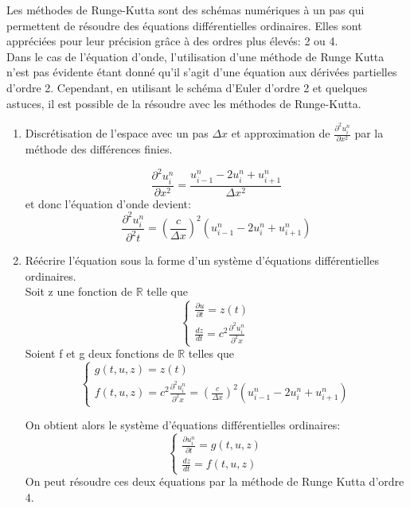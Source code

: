 Les méthodes de Runge-Kutta sont des schémas numériques à un pas qui permettent de résoudre des équations différentielles ordinaires.
Elles sont appréciées pour leur précision grâce à des ordres plus élevés: 2 ou 4.\\

Dans le cas de l'équation d'onde, l'utilisation d'une méthode de Runge Kutta n'est pas évidente étant donné qu'il s'agit d'une équation aux dérivées partielles d'ordre 2. Cependant, en utilisant le schéma d'Euler d'ordre 2 et quelques astuces, il est possible de la résoudre avec les méthodes de Runge-Kutta.

\begin{enumerate}
    \item Discrétisation de l'espace avec un pas $\Delta x$ et approximation de $\frac{\partial^2u^n_{i}}{\partial x^2}$ par la méthode des différences finies.
    
    \begin{equation*}
        \frac{\partial^2u^n_{i}}{\partial x^2}=\frac{u^n_{i-1} - 2u^n_{i} + u^n_{i+1}}{\Delta x^2} 
    \end{equation*}
    et donc l'équation d'onde devient:
    \begin{equation*}
        \frac{\partial^2u^n_{i}}{\partial^2t}=(\frac{c}{\Delta x})^2(u^n_{i-1} - 2u^n_{i} + u^n_{i+1})
    \end{equation*}
    
    \item Réécrire l'équation sous la forme d'un système d'équations différentielles ordinaires.\\
    
    Soit z une fonction de $\mathbb{R}$ telle que\\
    \[
      \begin{cases}
        \frac{\partial u}{\partial t}=z(t) \\
        \frac{dz}{dt}= c^2 \frac{\partial^2u^n_{i}}{\partial^2 x}
      \end{cases}
    \]
    \newline
    Soient f et g deux fonctions de $\mathbb{R}$ telles que 
      \[
      \begin{cases}
        g(t,u,z)=z(t) \\
        f(t,u,z)=c^2 \frac{\partial^2u^n_{i}}{\partial^2 x}=(\frac{c}{\Delta x})^2(u^n_{i-1} - 2u^n_{i} + u^n_{i+1})
      \end{cases}
    \]
    
    On obtient alors le système d'équations différentielles ordinaires:
      \[
      \begin{cases}
        \frac{\partial u^n_{i}}{\partial t}=g(t,u,z) \\
        \frac{dz}{dt}=f(t,u,z)
      \end{cases}
    \]
    On peut résoudre ces deux équations par la méthode de Runge Kutta d'ordre 4.\\
    

\end{enumerate}
